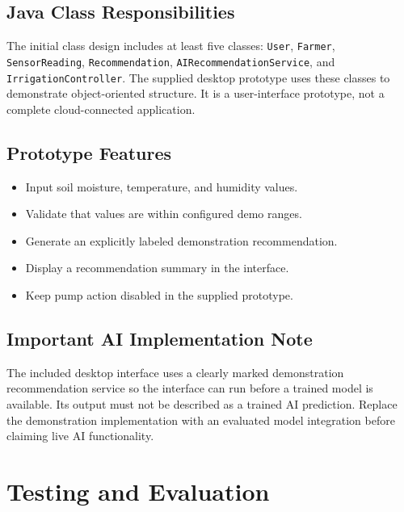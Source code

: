 \documentclass[12pt,a4paper]{report}
\begin{document}
\section{Java Class Responsibilities}
The initial class design includes at least five classes: \texttt{User}, \texttt{Farmer}, \texttt{SensorReading}, \texttt{Recommendation}, \texttt{AIRecommendationService}, and \texttt{IrrigationController}. The supplied desktop prototype uses these classes to demonstrate object-oriented structure. It is a user-interface prototype, not a complete cloud-connected application.

\section{Prototype Features}
\begin{itemize}[leftmargin=*]
\item Input soil moisture, temperature, and humidity values.
\item Validate that values are within configured demo ranges.
\item Generate an explicitly labeled demonstration recommendation.
\item Display a recommendation summary in the interface.
\item Keep pump action disabled in the supplied prototype.
\end{itemize}

\section{Important AI Implementation Note}
The included desktop interface uses a clearly marked demonstration recommendation service so the interface can run before a trained model is available. Its output must not be described as a trained AI prediction. Replace the demonstration implementation with an evaluated model integration before claiming live AI functionality.

\chapter{Testing and Evaluation}
\end{document}
